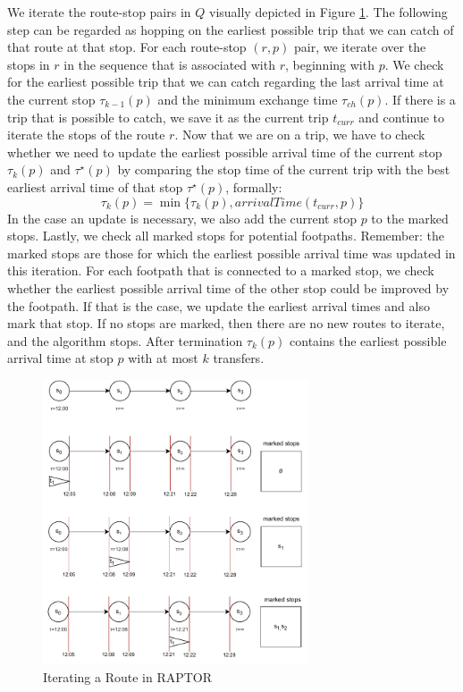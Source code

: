 We iterate the route-stop pairs in \(Q\) visually depicted in Figure \ref{fig:raptor}.
The following step can be regarded as hopping on the earliest possible trip that we can catch of that route at that stop.
For each route-stop \((r,p)\) pair, we iterate over the stops in \(r\) in the sequence that is associated with \(r\), beginning with \(p\).
We check for the earliest possible trip that we can catch regarding the last arrival time at the current stop \(\tau_{k-1}(p)\) and the minimum exchange time \(\tau_{ch}(p)\).
If there is a trip that is possible to catch, we save it as the current trip \(t_{curr}\) and continue to iterate the stops of the route \(r\).
Now that we are on a trip, we have to check whether we need to update the earliest possible arrival time of the current stop \(\tau_k(p)\) and \(\tau^\star(p)\) by comparing the stop time of the current trip with the best earliest arrival time of that stop \(\tau^\star(p)\), formally:
\[\tau_k(p) = \min\{\tau_k(p), arrivalTime(t_{curr}, p)\}\]
In the case an update is necessary, we also add the current stop \(p\) to the marked stops.
Lastly, we check all marked stops for potential footpaths.
Remember: the marked stops are those for which the earliest possible arrival time was updated in this iteration.
For each footpath that is connected to a marked stop, we check whether the earliest possible arrival time of the other stop could be improved by the footpath.
If that is the case, we update the earliest arrival times and also mark that stop.
If no stops are marked, then there are no new routes to iterate, and the algorithm stops.
After termination \(\tau_k(p)\) contains the earliest possible arrival time at stop \(p\) with at most \(k\) transfers.
\begin{figure}
    \centering
    \includegraphics[width=0.70\textwidth]{Figures/related_work/raptor.pdf}
    \caption{Iterating a Route in RAPTOR}
    \label{fig:raptor}
\end{figure}

